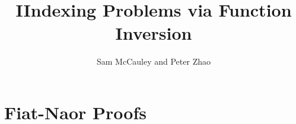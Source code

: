 \documentclass{article}
\title{IIndexing Problems via Function Inversion}
\author{Sam McCauley and Peter Zhao}
\date{}
\begin{document}
\maketitle

\section{Fiat-Naor Proofs}
\label{sec:fiat-naor}
\end{document}
